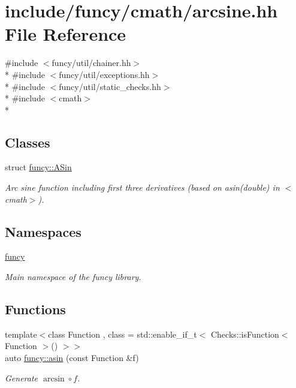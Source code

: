\hypertarget{arcsine_8hh}{\section{include/funcy/cmath/arcsine.hh File Reference}
\label{arcsine_8hh}
}
{\ttfamily \#include $<$funcy/util/chainer.\-hh$>$}\\*
{\ttfamily \#include $<$funcy/util/exceptions.\-hh$>$}\\*
{\ttfamily \#include $<$funcy/util/static\-\_\-checks.\-hh$>$}\\*
{\ttfamily \#include $<$cmath$>$}\\*
\subsection*{Classes}
\begin{DoxyCompactItemize}
\item 
struct \hyperlink{structfuncy_1_1ASin}{funcy\-::\-A\-Sin}
\begin{DoxyCompactList}\small\item\em Arc sine function including first three derivatives (based on asin(double) in $<$cmath$>$). \end{DoxyCompactList}\end{DoxyCompactItemize}
\subsection*{Namespaces}
\begin{DoxyCompactItemize}
\item 
\hyperlink{namespacefuncy}{funcy}
\begin{DoxyCompactList}\small\item\em Main namespace of the funcy library. \end{DoxyCompactList}\end{DoxyCompactItemize}
\subsection*{Functions}
\begin{DoxyCompactItemize}
\item 
{\footnotesize template$<$class Function , class  = std\-::enable\-\_\-if\-\_\-t$<$ Checks\-::is\-Function$<$ Function $>$() $>$$>$ }\\auto \hyperlink{group__CMathGroup_ga9829bc8e5bcafdb397fb518f960545d8}{funcy\-::asin} (const Function \&f)
\begin{DoxyCompactList}\small\item\em Generate $ \arcsin\circ f $. \end{DoxyCompactList}\end{DoxyCompactItemize}
